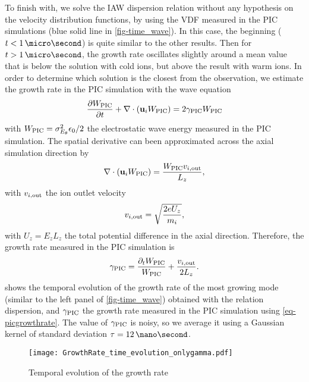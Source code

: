     To finish with, we solve the \ac{IAW} dispersion relation without any hypothesis on the velocity distribution functions, by using the VDF measured in the PIC simulations (blue solid line in  \cref{fig-time_wave}).
    In this case, the beginning ($t < 1 \,\micro\second$) is quite similar to the other results.
    Then for $t > 1 \,\micro\second$, the growth rate oscillates slightly around a mean value that is below the solution with cold ions, but above the result with warm ions.
    In order to determine which solution is the closest from the observation, we estimate the growth rate in the \ac{PIC} simulation with the wave equation
    \begin{equation} \label{eq-wequationbis}
      \frac{\partial W_{\rm PIC}}{\partial t} + \nabla \cdot ({\mathbf u_i} W_{\rm PIC}) = 2 \gamma_{\rm PIC} W_{\rm PIC}
    \end{equation}
    with $W_{\rm PIC} = \sigma_{E_{\theta}}^2 \epsilon_0/2$ the electrostatic wave energy measured in the \ac{PIC} simulation.
    The spatial derivative can been approximated across the axial simulation direction by
    \begin{equation} \label{eq-}
      \nabla \cdot ({\mathbf u_i} W_{\rm PIC}) = \frac{ W_{\rm PIC}  v_{i, \rm out} }{L_z},
    \end{equation}
    with $ v_{i, \rm out} $ the ion outlet velocity 
    \begin{equation} \label{eq-vout}
       v_{i, \rm out}  = \sqrt{\frac{2 e U_z}{m_i}},
    \end{equation}
    with $U_z = E_z L_z$ the total potential difference in the axial direction.
    Therefore, the growth rate measured in the \ac{PIC} simulation is
    \begin{equation} \label{eq-picgrowthrate}
      \gamma_{\rm PIC} = \frac{ \partial_t W_{\rm PIC} }{W_{\rm PIC}}  +\frac{  v_{i, \rm out} }{2 L_z}.
    \end{equation}
     shows the temporal evolution of the growth rate of the most growing mode (similar to the left panel of \cref{fig-time_wave}) obtained with the relation dispersion, and $\gamma_{\rm PIC}$ the growth rate measured in the \ac{PIC} simulation using \cref{eq-picgrowthrate}.
    The value of $\gamma_{\rm PIC}$ is noisy, so we average it using a Gaussian kernel of standard deviation $\tau = 12\,\nano\second$.
    \begin{figure}[hbtp]
      \centering
      \texttt{[image: GrowthRate\_time\_evolution\_onlygamma.pdf]}
      \caption{Temporal evolution of the growth rate}
      \label{fig-pic_growth_rate}
    \end{figure}
    

